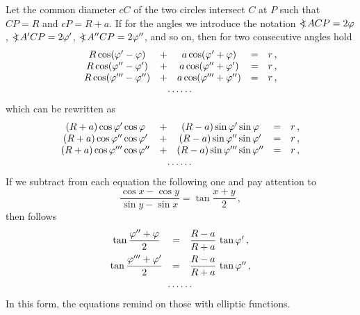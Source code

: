 Let the common diameter $cC$ of the two circles intersect $C$ at $P$ such that $CP = R$ and $cP = R+a$.
If for the angles we introduce the notation $<\mskip-10mu)\mskip4mu ACP = 2\varphi$, $<\mskip-10mu)\mskip4mu A'CP = 2\varphi'$, $<\mskip-10mu)\mskip4mu A''CP = 2\varphi''$, and so on, then for two consecutive angles hold
\def\arraycolsep{0.8mm}
\[ \begin{array}{ccccc}
      R\cos(\varphi'-\varphi) &+ &a\cos(\varphi' + \varphi) &= &r\,,\\ 
    R\cos(\varphi''-\varphi') &+ &a\cos(\varphi''+\varphi') &= &r\,,\\ 
  R\cos(\varphi'''-\varphi'') &+ &a\cos(\varphi'''+\varphi'') &= &r\,,\\
   \multicolumn{5}{c}{\dots\dots}
  \end{array}
\]   
which can be rewritten as
\[ \begin{array}{ccccc}
    (R+a)\cos\varphi' \cos\varphi &+ &(R-a)\sin\varphi' \sin\varphi &= &r\,,\\
   (R+a)\cos\varphi''\cos\varphi' &+ &(R-a)\sin\varphi''\sin\varphi' &= &r\,,\\
  (R+a)\cos\varphi'''\cos\varphi''&+ &(R-a)\sin\varphi'''\sin\varphi''&= &r\,,\\
   \multicolumn{5}{c}{\dots\dots}
  \end{array}
\]   
If we subtract from each equation the following one and pay attention to
\[  \frac{\cos x - \cos y}{\sin y - \sin x} = \tan\frac{x+y}2\,,
\]
then follows
\[ \begin{array}{ccl} 
    \tan \Frac{\varphi''+\varphi}2 &= &\Frac{R-a}{R+a}\,\tan\varphi'\,,
    \\[3.0mm]
   \tan \Frac{\varphi'''+\varphi'}2 &= &\Frac{R-a}{R+a}\,\tan\varphi''\,,
    \\[2.5mm]
   \multicolumn{3}{c}{\dots\dots}
  \end{array}
\]   
In this form, the equations remind on those with elliptic functions.
    
